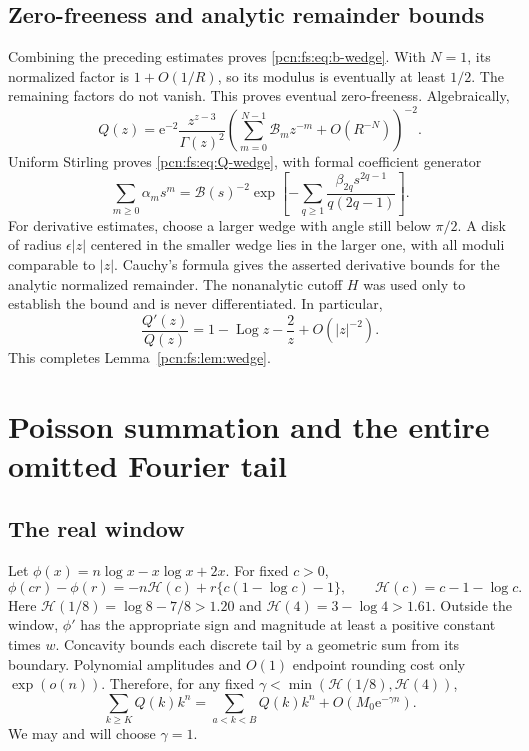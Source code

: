 \documentclass[11pt,letterpaper]{article}
\theoremstyle{remark}\newtheorem{remark}[theorem]{Remark}
\newcommand{\ee}{\mathrm e}
\newcommand{\Log}{\operatorname{Log}}
\begin{document}
\subsection{Zero-freeness and analytic remainder bounds}
Combining the preceding estimates proves \eqref{pcn:fs:eq:b-wedge}. With $N=1$, its normalized factor is $1+O(1/R)$, so its modulus is eventually at least $1/2$. The remaining factors do not vanish. This proves eventual zero-freeness.
Algebraically,
\[
 Q(z)=\ee^{-2}\frac{z^{z-3}}{\Gamma(z)^2}
          \left(\sum_{m=0}^{N-1}\mathcal B_mz^{-m}+O(R^{-N})\right)^{-2}.
\]
Uniform Stirling \cite[\S5.11]{DLMF} proves \eqref{pcn:fs:eq:Q-wedge}, with formal coefficient generator
\begin{equation}\label{pcn:fs:eq:alpha-generator}
 \sum_{m\ge0}\alpha_ms^m=
 \mathcal B(s)^{-2}\exp\left[-\sum_{q\ge1}
                \frac{\beta_{2q}s^{2q-1}}{q(2q-1)}\right].
\end{equation}
For derivative estimates, choose a larger wedge with angle still below $\pi/2$. A disk of radius $\epsilon|z|$ centered in the smaller wedge lies in the larger one, with all moduli comparable to $|z|$. Cauchy's formula gives the asserted derivative bounds for the analytic normalized remainder. The nonanalytic cutoff $H$ was used only to establish the bound and is never differentiated. In particular,
\begin{equation}\label{pcn:fs:eq:log-derivative}
 \frac{Q'(z)}{Q(z)}=1-\Log z-\frac2z+O(|z|^{-2}).
\end{equation}
This completes Lemma~\ref{pcn:fs:lem:wedge}.

\section{Poisson summation and the entire omitted Fourier tail}
\subsection{The real window}
Let $\phi(x)=n\log x-x\log x+2x$. For fixed $c>0$,
\begin{equation}\label{pcn:fs:eq:window-rate}
 \phi(cr)-\phi(r)=-n\mathcal H(c)
                +r\{c(1-\log c)-1\},\qquad
 \mathcal H(c)=c-1-\log c.
\end{equation}
Here $\mathcal H(1/8)=\log8-7/8>1.20$ and
$\mathcal H(4)=3-\log4>1.61$. Outside the window, $\phi'$ has the appropriate sign and magnitude at least a positive constant times $w$. Concavity bounds each discrete tail by a geometric sum from its boundary. Polynomial amplitudes and $O(1)$ endpoint rounding cost only $\exp(o(n))$. Therefore, for any fixed
$\gamma<\min(\mathcal H(1/8),\mathcal H(4))$,
\begin{equation}\label{pcn:fs:eq:window-tail}
 \sum_{k\ge K}Q(k)k^n
       =\sum_{a<k<B}Q(k)k^n+O(M_0\ee^{-\gamma n}).
\end{equation}
We may and will choose $\gamma=1$.
\end{document}

